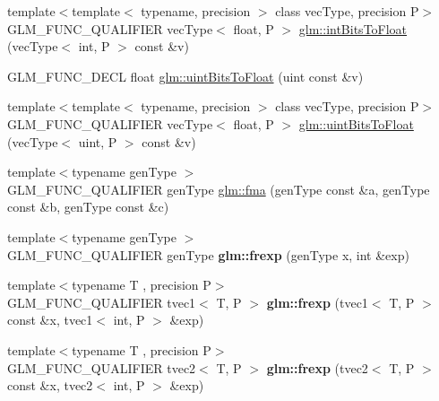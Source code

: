 \begin{DoxyCompactItemize}
\item 
{\footnotesize template$<$template$<$ typename, precision $>$ class vec\+Type, precision P$>$ }\\G\+L\+M\+\_\+\+F\+U\+N\+C\+\_\+\+Q\+U\+A\+L\+I\+F\+I\+ER vec\+Type$<$ float, P $>$ \hyperlink{group__core__func__common_gad21ab176dd0e6b59d923db5efca87f4e}{glm\+::int\+Bits\+To\+Float} (vec\+Type$<$ int, P $>$ const \&v)
\item 
G\+L\+M\+\_\+\+F\+U\+N\+C\+\_\+\+D\+E\+CL float \hyperlink{group__core__func__common_ga97464ca9ff4267de30ea408f700d4ca8}{glm\+::uint\+Bits\+To\+Float} (uint const \&v)
\item 
{\footnotesize template$<$template$<$ typename, precision $>$ class vec\+Type, precision P$>$ }\\G\+L\+M\+\_\+\+F\+U\+N\+C\+\_\+\+Q\+U\+A\+L\+I\+F\+I\+ER vec\+Type$<$ float, P $>$ \hyperlink{group__core__func__common_ga3acab37650ecd792dc84548094b58684}{glm\+::uint\+Bits\+To\+Float} (vec\+Type$<$ uint, P $>$ const \&v)
\item 
{\footnotesize template$<$typename gen\+Type $>$ }\\G\+L\+M\+\_\+\+F\+U\+N\+C\+\_\+\+Q\+U\+A\+L\+I\+F\+I\+ER gen\+Type \hyperlink{group__core__func__common_gad0f444d4b81cc53c3b6edf5aa25078c2}{glm\+::fma} (gen\+Type const \&a, gen\+Type const \&b, gen\+Type const \&c)
\item 
\mbox{\label{func__common_8inl_a90f422cea9e6e5c383bb69b593434c97}} 
{\footnotesize template$<$typename gen\+Type $>$ }\\G\+L\+M\+\_\+\+F\+U\+N\+C\+\_\+\+Q\+U\+A\+L\+I\+F\+I\+ER gen\+Type {\bfseries glm\+::frexp} (gen\+Type x, int \&exp)
\item 
\mbox{\label{func__common_8inl_ae456a3da34aba807bf8e621573333e65}} 
{\footnotesize template$<$typename T , precision P$>$ }\\G\+L\+M\+\_\+\+F\+U\+N\+C\+\_\+\+Q\+U\+A\+L\+I\+F\+I\+ER tvec1$<$ T, P $>$ {\bfseries glm\+::frexp} (tvec1$<$ T, P $>$ const \&x, tvec1$<$ int, P $>$ \&exp)
\item 
\mbox{\label{func__common_8inl_a0b0055e3fc459db5c3b7fa4acda93487}} 
{\footnotesize template$<$typename T , precision P$>$ }\\G\+L\+M\+\_\+\+F\+U\+N\+C\+\_\+\+Q\+U\+A\+L\+I\+F\+I\+ER tvec2$<$ T, P $>$ {\bfseries glm\+::frexp} (tvec2$<$ T, P $>$ const \&x, tvec2$<$ int, P $>$ \&exp)

\end{DoxyCompactItemize}

